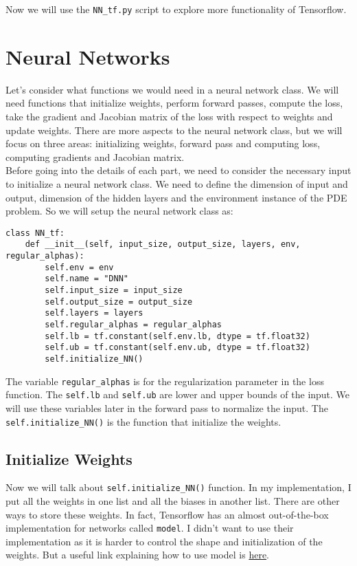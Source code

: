 \documentclass{article}
\begin{document}
Now we will use the \texttt{NN\_tf.py} script to explore more functionality of Tensorflow. 

\section{Neural Networks}
Let's consider what functions we would need in a neural network class. We will need functions that initialize weights, perform forward passes, compute the loss, take the gradient and Jacobian matrix of the loss with respect to weights and update weights. There are more aspects to the neural network class, but we will focus on three areas: initializing weights, forward pass and computing loss, computing gradients and Jacobian matrix. \\

Before going into the details of each part, we need to consider the necessary input to initialize a neural network class. We need to define the dimension of input and output, dimension of the hidden layers and the environment instance of the PDE problem. So we will setup the neural network class as:
\begin{lstlisting}
class NN_tf:
	def __init__(self, input_size, output_size, layers, env, regular_alphas):
		self.env = env
		self.name = "DNN"
		self.input_size = input_size
		self.output_size = output_size
		self.layers = layers
		self.regular_alphas = regular_alphas
		self.lb = tf.constant(self.env.lb, dtype = tf.float32)
		self.ub = tf.constant(self.env.ub, dtype = tf.float32)
		self.initialize_NN()
\end{lstlisting}

The variable \texttt{regular\_alphas} is for the regularization parameter in the loss function. The \texttt{self.lb} and \texttt{self.ub} are lower and upper bounds of the input. We will use these variables later in the forward pass to normalize the input. The \texttt{self.initialize\_NN()} is the function that initialize the weights. 

\subsection{Initialize Weights}
Now we will talk about \texttt{self.initialize\_NN()} function. In my implementation, I put all the weights in one list and all the biases in another list. There are other ways to store these weights. In fact, Tensorflow has an almost out-of-the-box implementation for networks called \texttt{model}. I didn't want to use their implementation as it is harder to control the shape and initialization of the weights. But a useful link explaining how to use model is \href{https://www.tensorflow.org/tutorials/customization/custom_layers}{here}. \\
\end{document}
